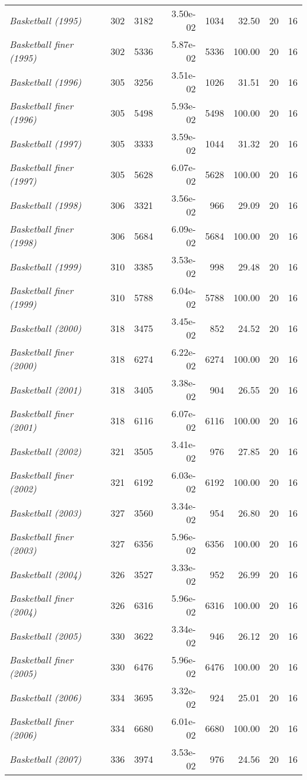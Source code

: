 \documentclass[nohyperref]{article}
\theoremstyle{plain}
\theoremstyle{definition}
\theoremstyle{remark}
\begin{document}
\begin{table}[tb!]
{\begin{tabular}{lrrrrrrr}
\textit{Basketball (1995)}&302&3182&3.50e-02&1034&32.50&20&16\\
\textit{Basketball finer (1995)}&302&5336&5.87e-02&5336&100.00&20&16\\
\textit{Basketball (1996)}&305&3256&3.51e-02&1026&31.51&20&16\\
\textit{Basketball finer (1996)}&305&5498&5.93e-02&5498&100.00&20&16\\
\textit{Basketball (1997)}&305&3333&3.59e-02&1044&31.32&20&16\\
\textit{Basketball finer (1997)}&305&5628&6.07e-02&5628&100.00&20&16\\
\textit{Basketball (1998)}&306&3321&3.56e-02&966&29.09&20&16\\
\textit{Basketball finer (1998)}&306&5684&6.09e-02&5684&100.00&20&16\\
\textit{Basketball (1999)}&310&3385&3.53e-02&998&29.48&20&16\\
\textit{Basketball finer (1999)}&310&5788&6.04e-02&5788&100.00&20&16\\
\textit{Basketball (2000)}&318&3475&3.45e-02&852&24.52&20&16\\
\textit{Basketball finer (2000)}&318&6274&6.22e-02&6274&100.00&20&16\\
\textit{Basketball (2001)}&318&3405&3.38e-02&904&26.55&20&16\\
\textit{Basketball finer (2001)}&318&6116&6.07e-02&6116&100.00&20&16\\
\textit{Basketball (2002)}&321&3505&3.41e-02&976&27.85&20&16\\
\textit{Basketball finer (2002)}&321&6192&6.03e-02&6192&100.00&20&16\\
\textit{Basketball (2003)}&327&3560&3.34e-02&954&26.80&20&16\\
\textit{Basketball finer (2003)}&327&6356&5.96e-02&6356&100.00&20&16\\
\textit{Basketball (2004)}&326&3527&3.33e-02&952&26.99&20&16\\
\textit{Basketball finer (2004)}&326&6316&5.96e-02&6316&100.00&20&16\\
\textit{Basketball (2005)}&330&3622&3.34e-02&946&26.12&20&16\\
\textit{Basketball finer (2005)}&330&6476&5.96e-02&6476&100.00&20&16\\
\textit{Basketball (2006)}&334&3695&3.32e-02&924&25.01&20&16\\
\textit{Basketball finer (2006)}&334&6680&6.01e-02&6680&100.00&20&16\\
\textit{Basketball (2007)}&336&3974&3.53e-02&976&24.56&20&16\\

\end{tabular}}
\end{table}
\end{document}
